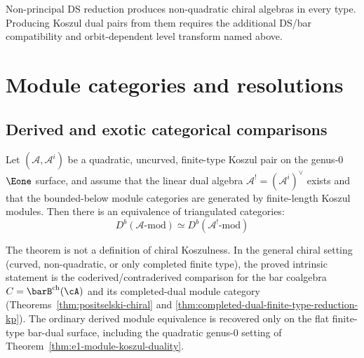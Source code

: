 Non-principal DS reduction produces non-quadratic chiral algebras in
every type.  Producing Koszul dual pairs from them requires the
additional DS/bar compatibility and orbit-dependent level transform
named above.


\section{Module categories and resolutions}

\subsection{Derived and exotic categorical comparisons}

\begin{theorem}
\label{thm:koszul-equivalence-categories}
Let $(\mathcal{A},\mathcal{A}^i)$ be a quadratic, uncurved,
finite-type Koszul pair on the genus-$0$ $\Eone$ surface, and assume
that the linear dual algebra
$\mathcal{A}^!=(\mathcal{A}^i)^\vee$ exists and that the
bounded-below module categories are generated by finite-length
Koszul modules.  Then there is an equivalence of triangulated
categories:
\[
D^b(\mathcal{A}\text{-mod}) \simeq D^b(\mathcal{A}^!\text{-mod})
\]
\end{theorem}

\begin{remark}\label{rem:module-equiv-caveat}
The theorem is not a definition of chiral Koszulness.  In the general
chiral setting \textup{(}curved, non-quadratic, or only completed
finite type\textup{)}, the proved intrinsic statement is the
coderived/contraderived comparison for the bar coalgebra
$C=\barB^{\mathrm{ch}}(\cA)$ and its completed-dual module category
\textup{(}Theorems~\ref{thm:positselski-chiral} and
\ref{thm:completed-dual-finite-type-reduction-kp}\textup{)}. The ordinary derived
module equivalence is recovered only on the flat finite-type bar-dual
surface, including the quadratic genus-$0$ setting of
Theorem~\ref{thm:e1-module-koszul-duality}.
\end{remark}

